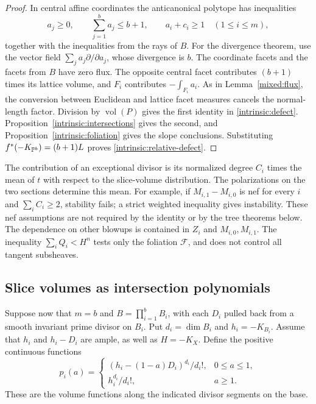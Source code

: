 \begin{proof}
In central affine coordinates the anticanonical polytope has inequalities
\[
 a_j\ge0,\qquad \sum_{j=1}^ba_j\le b+1,\qquad
 a_i+c_i\ge1\quad(1\le i\le m),
\]
together with the inequalities from the rays of $B$. For the divergence
theorem, use the vector field $\sum_ja_j\partial/\partial a_j$,
whose divergence is $b$.
The coordinate facets and the facets from $B$ have zero flux. The
opposite central facet contributes $(b+1)$ times its lattice volume,
and $F_i$ contributes $-\int_{F_i}a_i$. As in
Lemma~\ref{mixed:flux}, the conversion between Euclidean and lattice
facet measures cancels the normal-length factor. Division by
$\operatorname{vol}(P)$ gives the first identity in
\eqref{intrinsic:defect}. Proposition~\ref{intrinsic:intersections}
gives the second, and Proposition~\ref{intrinsic:foliation} gives the
slope conclusions. Substituting $f^*(-K_{\mathbb{P}^b})=(b+1)L$ proves
\eqref{intrinsic:relative-defect}.
\end{proof}

The contribution of an exceptional divisor is its normalized degree
$C_i$ times the mean of $t$ with respect to the slice-volume
distribution. The polarizations on the two sections determine this
mean. For example, if $M_{i,1}-M_{i,0}$ is nef for every $i$ and
$\sum_iC_i\ge2$, stability fails; a strict weighted inequality gives
instability. These nef assumptions are not required by the identity
or by the tree theorems below. The dependence on other blowups is
contained in $Z_i$ and $M_{i,0},M_{i,1}$. The inequality
$\sum_iQ_i<H^n$ tests only the foliation $\mathcal F$, and does not
control all tangent subsheaves.

\subsection{Slice volumes as intersection polynomials}

Suppose now that $m=b$ and $B=\prod_{i=1}^bB_i$, with each $D_i$
pulled back from a smooth invariant prime divisor on $B_i$. Put $d_i=\dim B_i$ and $h_i=-K_{B_i}$.
Assume that $h_i$ and $h_i-D_i$ are ample, as well as $H=-K_X$.
Define the positive continuous functions
\begin{equation}\label{intrinsic:profiles}
 p_i(a)=
 \begin{cases}
 (h_i-(1-a)D_i)^{d_i}/d_i!,&0\le a\le1,\\
 h_i^{d_i}/d_i!,&a\ge1.
 \end{cases}
\end{equation}
These are the volume functions along the indicated divisor segments
on the base.

